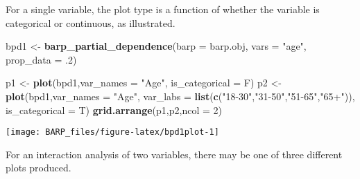 \documentclass[]{article}
\newenvironment{Shaded}{\begin{snugshade}}{\end{snugshade}}
\newcommand{\KeywordTok}[1]{\textcolor[rgb]{0.13,0.29,0.53}{\textbf{#1}}}
\newcommand{\DataTypeTok}[1]{\textcolor[rgb]{0.13,0.29,0.53}{#1}}
\newcommand{\DecValTok}[1]{\textcolor[rgb]{0.00,0.00,0.81}{#1}}
\newcommand{\StringTok}[1]{\textcolor[rgb]{0.31,0.60,0.02}{#1}}
\newcommand{\NormalTok}[1]{#1}
\begin{document}
For a single variable, the plot type is a function of whether the
variable is categorical or continuous, as illustrated.

\begin{Shaded}
\begin{Highlighting}[]
\NormalTok{bpd1 <-}\StringTok{ }\KeywordTok{barp_partial_dependence}\NormalTok{(}\DataTypeTok{barp =}\NormalTok{ barp.obj,}
                               \DataTypeTok{vars =} \StringTok{"age"}\NormalTok{,}
                               \DataTypeTok{prop_data =}\NormalTok{ .}\DecValTok{2}\NormalTok{)}
\end{Highlighting}
\end{Shaded}

\begin{Shaded}
\begin{Highlighting}[]
\NormalTok{p1 <-}\StringTok{ }\KeywordTok{plot}\NormalTok{(bpd1,}\DataTypeTok{var_names =} \StringTok{"Age"}\NormalTok{,}
           \DataTypeTok{is_categorical =}\NormalTok{ F)}
\NormalTok{p2 <-}\StringTok{ }\KeywordTok{plot}\NormalTok{(bpd1,}\DataTypeTok{var_names =} \StringTok{"Age"}\NormalTok{,}
           \DataTypeTok{var_labs =} \KeywordTok{list}\NormalTok{(}\KeywordTok{c}\NormalTok{(}\StringTok{"18-30"}\NormalTok{,}\StringTok{"31-50"}\NormalTok{,}\StringTok{"51-65"}\NormalTok{,}\StringTok{"65+"}\NormalTok{)),}
           \DataTypeTok{is_categorical =}\NormalTok{ T)}
\KeywordTok{grid.arrange}\NormalTok{(p1,p2,}\DataTypeTok{ncol =} \DecValTok{2}\NormalTok{)}
\end{Highlighting}
\end{Shaded}

\begin{center}\texttt{[image: BARP\_files/figure-latex/bpd1plot-1]} \end{center}

For an interaction analysis of two variables, there may be one of three
different plots produced.
\end{document}
